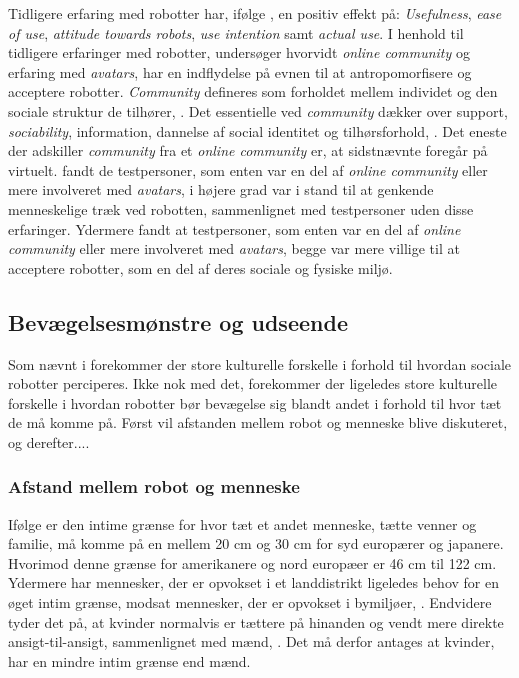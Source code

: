 Tidligere erfaring med robotter har, ifølge \textcite[s. 1479]{PDF:ExploringInfluencingVariable}, en positiv effekt på: \textit{Usefulness}, \textit{ease of use}, \textit{attitude towards robots}, \textit{use intention} samt \textit{actual use}. I henhold til tidligere erfaringer med robotter, undersøger \textcite{PDF:CloseButNotStuck} hvorvidt \textit{online community} og erfaring med \textit{avatars}, har en indflydelse på evnen til at antropomorfisere og acceptere robotter. \textit{Community} defineres som forholdet mellem individet og den sociale struktur de tilhører, \parencite[ss. 20-21]{PDF:CloseButNotStuck}. Det essentielle ved \textit{community} dækker over support, \textit{sociability}, information, dannelse af social identitet og tilhørsforhold, \parencite[s. 21]{PDF:CloseButNotStuck}. Det eneste der adskiller \textit{community} fra et \textit{online community} er, at sidstnævnte foregår på virtuelt. \textcite[s. 25]{PDF:CloseButNotStuck} fandt de testpersoner, som enten var en del af \textit{online community} eller mere involveret med \textit{avatars}, i højere grad var i stand til at genkende menneskelige træk ved robotten, sammenlignet med testpersoner uden disse erfaringer. Ydermere fandt \textcite[s. 26]{PDF:CloseButNotStuck} at testpersoner, som enten var en del af \textit{online community} eller mere involveret med \textit{avatars}, begge var mere villige til at acceptere robotter, som en del af deres sociale og fysiske miljø.  
%

\subsection{Bevægelsesmønstre og udseende}
\label{InteraktionSocialeRobotterParametreBevaegelsesmoenstre}
%
Som nævnt i  forekommer der store kulturelle forskelle i forhold til hvordan sociale robotter perciperes. Ikke nok med det, forekommer der ligeledes store kulturelle forskelle i hvordan robotter bør bevægelse sig blandt andet i forhold til hvor tæt de må komme på. Først vil afstanden mellem robot og menneske blive diskuteret, og derefter.... 

\subsubsection*{Afstand mellem robot og menneske}
\label{InteraktionSocialeRobotterParametreBevaegelsesmoenstreAfstand}
%
Ifølge \textcite[s. 178]{PDF:HowMayIServeYou} er den intime grænse for hvor tæt et andet menneske, tætte venner og familie, må komme på en mellem 20 cm og 30 cm for syd europærer og japanere. Hvorimod denne grænse for amerikanere og nord europæer er 46 cm til 122 cm. Ydermere har mennesker, der er opvokset i et landdistrikt ligeledes behov for en øget intim grænse, modsat mennesker, der er opvokset i bymiljøer, \textcite[s. 178]{PDF:HowMayIServeYou}. Endvidere tyder det på, at kvinder normalvis er tættere på hinanden og vendt mere direkte ansigt-til-ansigt, sammenlignet med mænd, \parencite[s. 178]{PDF:HowMayIServeYou}. Det må derfor antages at kvinder, har en mindre intim grænse end mænd.

